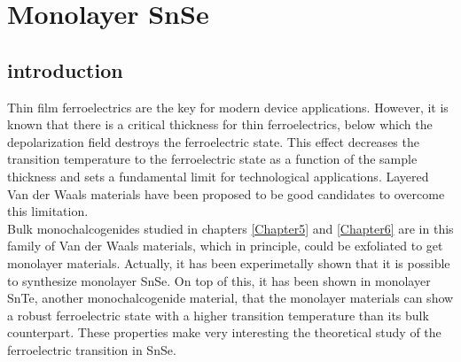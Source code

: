
\chapter{Monolayer SnSe} %

\label{Chapter7} %




\section{introduction}

Thin film ferroelectrics are the key for modern device applications\cite{lallart2011ferroelectrics}. However, it is 
known that there is a critical thickness for thin ferroelectrics, below which the depolarization field destroys the 
ferroelectric state\cite{batra1973new,zhong1994giant,dawber2005physics}. This effect decreases the transition 
temperature to the ferroelectric state as a function of the sample 
thickness\cite{fong2004ferroelectricity,fong2006stabilization} and sets a fundamental limit for technological  
applications. Layered Van der Waals materials have been proposed to be good candidates to overcome this 
limitation\cite{shirodkar2014emergence,fei2016ferroelectricity}. \\

Bulk monochalcogenides studied in chapters \ref{Chapter5} and \ref{Chapter6} are in this family of Van der Waals 
materials, which in principle, could be exfoliated to get monolayer materials. Actually, it has been experimetally 
shown that it is possible to synthesize monolayer SnSe\cite{li2013single,zhao2015controlled}. On top of this, it has 
been shown in monolayer SnTe, another monochalcogenide material, that the monolayer materials can show a robust 
ferroelectric state with a higher transition temperature than its bulk counterpart\cite{chang2016discovery}. These 
properties make very interesting the theoretical study of the ferroelectric transition in SnSe. \\

